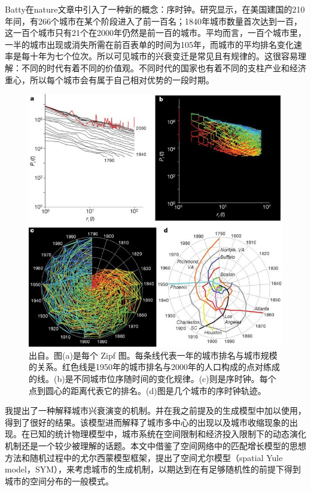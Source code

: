 Batty在nature文章\cite{Batty2006}中引入了一种新的概念：序时钟。研究显示，在美国建国的210年间，有266个城市在某个阶段进入了前一百名；1840年城市数量首次达到一百，这一百个城市只有21个在2000年仍然是前一百的城市。平均而言，一百个城市里，一半的城市出现或消失所需在前百表单的时间为105年，而城市的平均排名变化速率是每十年为七个位次。所以可见城市的兴衰变迁是常见且有规律的。这很容易理解：不同的时代有着不同的价值观。不同时代的国家也有着不同的支柱产业和经济重心，所以每个城市会有属于自己相对优势的一段时期。

\begin{figure}
    \centering
    \includegraphics[width = 0.9\linewidth]{pictures/rankclocks.jpg}
    \caption{出自\cite{Batty2006}。图(a)是每个 Zipf 图。每条线代表一年的城市排名与城市规模的关系。红色线是1950年的城市排名与2000年的人口构成的点对练成的线。(b)是不同城市位序随时间的变化规律。(c)则是序时钟。每个点到圆心的距离代表它的排名。(d)图是几个城市的序时钟轨迹。}
\end{figure}

我提出了一种解释城市兴衰演变的机制。并在我之前提及的生成模型中加以使用，得到了很好的结果。该模型进而解释了城市多中心的出现以及城市收缩\cite{martinezfernandez2012shrinking}现象的出现。在已知的统计物理模型中，城市系统在空间限制和经济投入限制下的动态演化机制还是一个较少被理解的话题。本文中借鉴了空间网络中的匹配增长模型的思想方法和随机过程中的尤尔西蒙模型框架，提出了空间尤尔模型（spatial Yule model，SYM），来考虑城市的生成机制，以期达到在有足够随机性的前提下得到城市的空间分布的一般模式。

